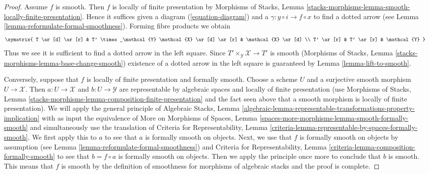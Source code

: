 \begin{proof}
Assume $f$ is smooth. Then $f$ is locally of finite presentation by
Morphisms of Stacks, Lemma
\ref{stacks-morphisms-lemma-smooth-locally-finite-presentation}.
Hence it suffices given a diagram (\ref{equation-diagram})
and a $\gamma : y \circ i \to f \circ x$ to find a dotted
arrow (see Lemma \ref{lemma-reformulate-formal-smoothness}).
Forming fibre products we obtain
$$
\xymatrix{
T \ar[d] \ar[r] &
T' \times_\mathcal{Y} \mathcal{X} \ar[d] \ar[r] &
\mathcal{X} \ar[d] \\
T' \ar[r] & T' \ar[r] & \mathcal{Y}
}
$$
Thus we see it is sufficient to find a dotted arrow in the
left square. Since $T' \times_\mathcal{Y} \mathcal{X} \to T'$
is smooth
(Morphisms of Stacks, Lemma \ref{stacks-morphisms-lemma-base-change-smooth})
existence of a dotted arrow in the left square is guaranteed by
Lemma \ref{lemma-lift-to-smooth}.

\medskip\noindent
Conversely, suppose that $f$ is locally of finite presentation and
formally smooth. Choose a scheme $U$ and a surjective smooth morphism
$U \to \mathcal{X}$. Then $a : U \to \mathcal{X}$ and $b : U \to \mathcal{Y}$
are representable by algebraic spaces and locally of finite presentation
(use Morphisms of Stacks, Lemma
\ref{stacks-morphisms-lemma-composition-finite-presentation}
and the fact seen above
that a smooth morphism is locally of finite presentation).
We will apply the general principle of
Algebraic Stacks, Lemma
\ref{algebraic-lemma-representable-transformations-property-implication}
with as input the equivalence of More on Morphisms of Spaces,
Lemma \ref{spaces-more-morphisms-lemma-smooth-formally-smooth}
and simultaneously use the translation of
Criteria for Representability, Lemma
\ref{criteria-lemma-representable-by-spaces-formally-smooth}.
We first apply this to $a$ to see that $a$ is
formally smooth on objects. Next, we use that $f$ is
formally smooth on objects by assumption
(see Lemma \ref{lemma-reformulate-formal-smoothness})
and Criteria for Representability, Lemma
\ref{criteria-lemma-composition-formally-smooth}
to see that $b = f \circ a$ is formally smooth on objects.
Then we apply the principle once more to conclude that $b$ is smooth.
This means that $f$ is smooth by the definition of smoothness
for morphisms of algebraic stacks and the proof is complete.
\end{proof}










